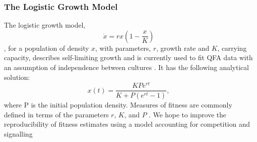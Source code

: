 \begin{multicols}{2}
\subsubsection{The Logistic Growth Model}
\label{sec:logistic_model}
The logistic growth model,
\begin{equation}
  \label{eq:1}
  \dot{x} = rx\left(1 - \frac{x}{K}\right)
\end{equation}
\citep{Verhulst1845}, for a population of density \(x\), with parameters, \(r\), growth
rate and \(K\), carrying capacity, describes self-limiting growth and is currently used to
fit QFA data with an assumption of independence between cultures
\citep{Addinall2011,qfa2016}. It has the following analytical solution:
\begin{equation}
  \label{eq:2}
  x(t) = \frac{KPe^{rt}}{K + P(e^{rt}-1)},
\end{equation}
where P is the initial population density. Measures of fitness are commonly defined in
terms of the parameters \(r\), \(K\), and \(P\) \citep{Addinall2011}. We hope to improve
the reproducibility of fitness estimates using a model accounting for competition and
signalling


\end{multicols}
